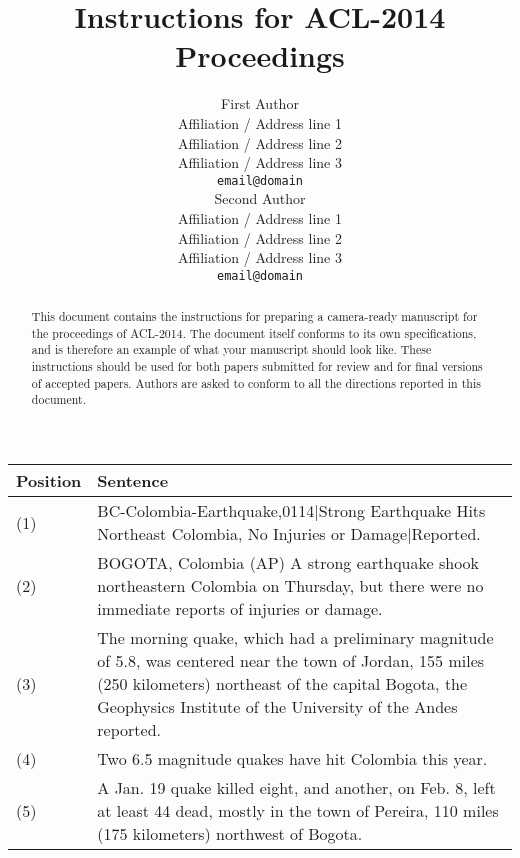 \documentclass[11pt]{article}
\title{Instructions for ACL-2014 Proceedings}
\author{First Author \\
  Affiliation / Address line 1 \\
  Affiliation / Address line 2 \\
  Affiliation / Address line 3 \\
  {\tt email@domain} \\\And
  Second Author \\
  Affiliation / Address line 1 \\
  Affiliation / Address line 2 \\
  Affiliation / Address line 3 \\
  {\tt email@domain} \\}
\date{}
\begin{document}
\maketitle
\begin{abstract}
  This document contains the instructions for preparing a camera-ready
  manuscript for the proceedings of ACL-2014. The document itself
  conforms to its own specifications, and is therefore an example of
  what your manuscript should look like. These instructions should be
  used for both papers submitted for review and for final versions of
  accepted papers.  Authors are asked to conform to all the directions
  reported in this document.
\end{abstract}

\begin{figure*}[h]
\begin{tabular}{ll}
\toprule
Position &  Sentence  \\
\midrule
(1) & BC-Colombia-Earthquake,0114|Strong Earthquake Hits Northeast Colombia, No Injuries or Damage|Reported.\\
(2) & BOGOTA, Colombia (AP) A strong earthquake shook northeastern Colombia on Thursday, but there were no immediate reports of injuries or damage.\\
(3) & The morning quake, which had a preliminary magnitude of 5.8, was centered near the town of Jordan, 155 miles (250 kilometers) northeast of the capital Bogota, the Geophysics Institute of the University of the Andes reported.\\
(4) & Two 6.5 magnitude quakes have hit Colombia this year.\\
(5) & A Jan. 19 quake killed eight, and another, on Feb. 8, left at least 44 dead, mostly in the town of Pereira, 110 miles (175 kilometers) northwest of Bogota.\\
\bottomrule
\end{tabular}
\end{figure*}
\end{document}
